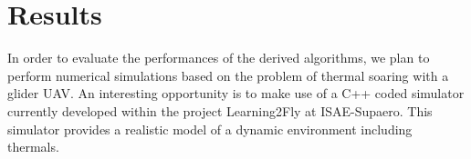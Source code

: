 \documentclass[]{article}
\begin{document}

\section{Results}

In order to evaluate the performances of the derived algorithms, we plan to perform numerical simulations based on the problem of thermal soaring with a glider UAV. An interesting opportunity is to make use of a C++ coded simulator currently developed within the project Learning2Fly at ISAE-Supaero. This simulator provides a realistic model of a dynamic environment including thermals.




\end{document}
